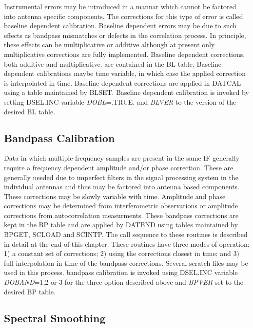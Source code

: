    Instrumental errors may be introduced in a mannar which cannot be
factored into antenna specific components.  The corrections for this
type of error is called baseline dependent calibration.  Baseline
dependent errors may be due to such effects as bandpass mismatches or
defects in the correlation process.  In principle, these effects can
be multiplicative or additive although at present only multiplicative
corrections are fully implemented.  Baseline dependent corrections,
both additive and multiplicative, are contained in the BL
table.  Baseline dependent calibrations maybe time
variable, in which case the applied correction is interpolated in
time.  Baseline dependent corrections are applied in
DATCAL using a table maintained by BLSET.
Baseline dependent calibration is invoked by setting
DSEL.INC variable {\it DOBL}=.TRUE. and {\it BLVER} to
the version of the desired BL table.

\subsection{Bandpass Calibration}

   Data in which multiple frequency samples are present in the same IF
generally require a frequency dependent amplitude and/or phase
correction.  These are generally needed due to imperfect filters in
the signal processing system in the individual antennas and thus may
be factored into antenna based components.  These corrections may be
slowly variable with time.  Amplitude and phase corrections may be
determined from interferometric observations or amplitude corrections
from autocorrelation measurments.  These bandpass corrections are kept
in the BP table and are applied by
DATBND using tables maintained by BPGET,
SCLOAD and SCINTP.  The call sequence to
these routines is described in detail at the end of this chapter.
These routines have three modes of operation: 1) a constant set of
corrections; 2) using the corrections closest in time; and 3) full
interpolation in time of the bandpass corrections.  Several scratch
files may be used in this process.   bandpass calibration is invoked
using DSEL.INC variable {\it DOBAND}=1,2 or 3 for the
three option described above and {\it BPVER} set to the desired BP
table.

\subsection{Spectral Smoothing}

